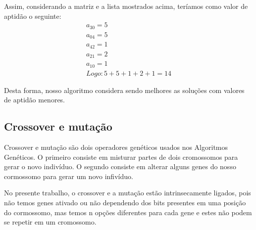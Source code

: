 \documentclass[a4paper,12pt]{article}
\begin{document}
  Assim, considerando a matriz e a lista mostrados acima, teríamos como valor de
  aptidão o seguinte:
  \begin{align*}
    a_{30}=5 \\
    a_{04}=5 \\
    a_{42}=1 \\
    a_{21}=2 \\
    a_{10}=1 \\
    Logo: 5+5+1+2+1 = 14
  \end{align*}

  Desta forma, nosso algoritmo considera sendo melhores as soluções com valores
  de aptidão menores.

  \subsection{Crossover e mutação}
  Crossover e mutação são dois operadores genéticos usados nos Algoritmos
  Genéticos. O primeiro consiste em misturar partes de dois cromossomos para
  gerar o novo indivíduo. O segundo consiste em alterar alguns genes do nosso
  cormossomo para gerar um novo infivíduo.

  No presente trabalho, o crossover e a mutação estão intrinsecamente ligados,
  pois não temos genes ativado ou não dependendo dos bits presentes em uma
  posição do cormossomo, mas temos n opções diferentes para cada gene e estes
  não podem se repetir em um cromossomo.

  
\end{document}
